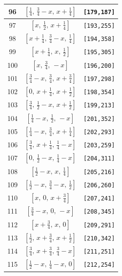 \documentclass[fleqn,8pt]{jsarticle}
\begin{document}
\begin{longtable}{ccc}
96 & $\left[ \frac{1}{4},\, \frac{3}{4} - x,\, x + \frac{1}{4} \right]$ & {\tt [179,187]} \\ \hline
97 & $\left[ x,\, \frac{1}{2},\, x + \frac{1}{4} \right]$ & {\tt [193,255]} \\ \hline
98 & $\left[ x + \frac{1}{4},\, \frac{3}{4} - x,\, \frac{1}{4} \right]$ & {\tt [194,358]} \\ \hline
99 & $\left[ x + \frac{1}{4},\, x,\, \frac{1}{2} \right]$ & {\tt [195,305]} \\ \hline
100 & $\left[ x,\, \frac{3}{4},\, - x \right]$ & {\tt [196,200]} \\ \hline
101 & $\left[ \frac{3}{4} - x,\, \frac{3}{4},\, x + \frac{3}{4} \right]$ & {\tt [197,298]} \\ \hline
102 & $\left[ 0,\, x + \frac{1}{4},\, x + \frac{1}{2} \right]$ & {\tt [198,354]} \\ \hline
103 & $\left[ \frac{3}{4},\, \frac{1}{2} - x,\, x + \frac{1}{2} \right]$ & {\tt [199,213]} \\ \hline
104 & $\left[ \frac{1}{4} - x,\, \frac{1}{2},\, - x \right]$ & {\tt [201,352]} \\ \hline
105 & $\left[ \frac{1}{4} - x,\, \frac{3}{4},\, x + \frac{1}{4} \right]$ & {\tt [202,293]} \\ \hline
106 & $\left[ \frac{3}{4},\, x + \frac{1}{4},\, \frac{1}{4} - x \right]$ & {\tt [203,259]} \\ \hline
107 & $\left[ 0,\, \frac{1}{2} - x,\, \frac{1}{4} - x \right]$ & {\tt [204,311]} \\ \hline
108 & $\left[ \frac{1}{2} - x,\, x,\, \frac{1}{4} \right]$ & {\tt [205,216]} \\ \hline
109 & $\left[ \frac{1}{2} - x,\, \frac{3}{4} - x,\, \frac{1}{2} \right]$ & {\tt [206,260]} \\ \hline
110 & $\left[ x,\, 0,\, x + \frac{3}{4} \right]$ & {\tt [207,241]} \\ \hline
111 & $\left[ \frac{3}{4} - x,\, 0,\, - x \right]$ & {\tt [208,345]} \\ \hline
112 & $\left[ x + \frac{3}{4},\, x,\, 0 \right]$ & {\tt [209,291]} \\ \hline
113 & $\left[ \frac{1}{2},\, x + \frac{3}{4},\, x + \frac{1}{2} \right]$ & {\tt [210,342]} \\ \hline
114 & $\left[ \frac{3}{4},\, x + \frac{3}{4},\, \frac{3}{4} - x \right]$ & {\tt [211,251]} \\ \hline
115 & $\left[ \frac{1}{2} - x,\, \frac{1}{4} - x,\, 0 \right]$ & {\tt [212,254]} \\ \hline

\end{longtable}
\end{document}
